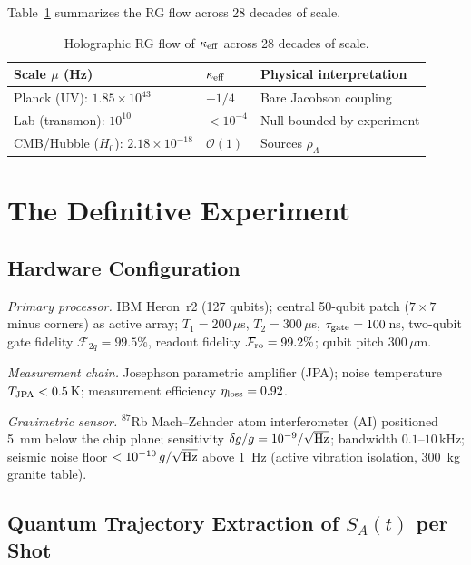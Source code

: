 \documentclass[12pt,letterpaper]{article}
\theoremstyle{definition}
\theoremstyle{remark}
\begin{document}
\noindent Table~\ref{tab:RGflow} summarizes the RG flow across 28 decades of scale.

\begin{table}[htbp]
\centering
\caption{Holographic RG flow of $\kappa_{\rm eff}$ across 28 decades of scale.}
\label{tab:RGflow}
\renewcommand{\arraystretch}{1.3}
\begin{tabular}{@{}lll@{}}
\toprule
Scale $\mu$ (Hz) & $\kappa_{\rm eff}$ & Physical interpretation \\
\midrule
Planck (UV): $1.85\times10^{43}$ & $-1/4$ & Bare Jacobson coupling \\
Lab (transmon): $10^{10}$ & $<10^{-4}$ & Null-bounded by experiment \\
CMB/Hubble ($H_0$): $2.18\times10^{-18}$ & $\mathcal{O}(1)$ & Sources $\rho_\Lambda$ \\
\bottomrule
\end{tabular}
\end{table}

\section{The Definitive Experiment}
\label{sec:experiment}

\subsection{Hardware Configuration}

\textit{Primary processor.}
IBM Heron~r2 (127 qubits); central 50-qubit patch ($7\times7$ minus corners) as active
array; $T_1 = 200\,\mu$s, $T_2 = 300\,\mu$s, $\tau_{\rm gate} = 100\,$ns,
two-qubit gate fidelity $\mathcal{F}_{2q} = 99.5\%$, readout fidelity
$\mathcal{F}_{\rm ro} = 99.2\%$; qubit pitch $300\,\mu$m.

\textit{Measurement chain.}
Josephson parametric amplifier (JPA); noise temperature $T_{\rm JPA} < 0.5\,$K;
measurement efficiency $\eta_{\rm loss} = 0.92$.

\textit{Gravimetric sensor.}
$^{87}$Rb Mach--Zehnder atom interferometer (AI) positioned 5~mm below the chip plane;
sensitivity $\delta g/g = 10^{-9}/\sqrt{{\rm Hz}}$; bandwidth $0.1$--$10\,$kHz;
seismic noise floor $< 10^{-10}\,g/\sqrt{{\rm Hz}}$ above 1~Hz (active vibration
isolation, 300~kg granite table).

\subsection{Quantum Trajectory Extraction of \texorpdfstring{$S_A(t)$}{SA(t)} per Shot}
\end{document}
